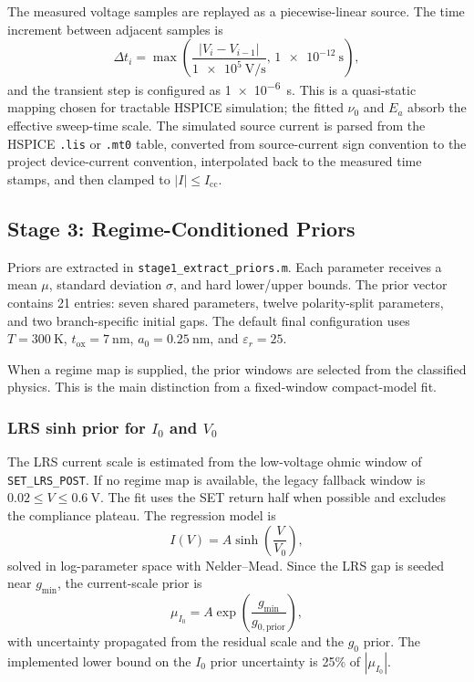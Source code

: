 \documentclass[journal]{IEEEtran}
\begin{document}
The measured voltage samples are replayed as a piecewise-linear source.  The
time increment between adjacent samples is
\[
  \Delta t_i =
  \max\left(\frac{|V_i-V_{i-1}|}{\SI{1e5}{\volt\per\second}},\,
  \SI{1e-12}{\second}\right),
\]
and the transient step is configured as \SI{1e-6}{\second}.  This is a
quasi-static mapping chosen for tractable HSPICE simulation; the fitted
$\nu_0$ and $E_a$ absorb the effective sweep-time scale.  The simulated source
current is parsed from the HSPICE \texttt{.lis} or \texttt{.mt0} table,
converted from source-current sign convention to the project device-current
convention, interpolated back to the measured time stamps, and then clamped to
$|I|\le I_{\mathrm{cc}}$.

\subsection{Stage 3: Regime-Conditioned Priors}
\label{sec:priors}

Priors are extracted in \texttt{stage1\_extract\_priors.m}.  Each parameter
receives a mean $\mu$, standard deviation $\sigma$, and hard lower/upper
bounds.  The prior vector contains 21 entries: seven shared parameters,
twelve polarity-split parameters, and two branch-specific initial gaps.  The
default final configuration uses $T=\SI{300}{\kelvin}$,
$t_{\mathrm{ox}}=\SI{7}{\nano\meter}$,
$a_0=\SI{0.25}{\nano\meter}$, and
$\varepsilon_r=25$.

When a regime map is supplied, the prior windows are selected from the
classified physics.  This is the main distinction from a fixed-window
compact-model fit.

\subsubsection{LRS sinh prior for $I_0$ and $V_0$}
The LRS current scale is estimated from the low-voltage ohmic window of
\texttt{SET\_LRS\_POST}.  If no regime map is available, the legacy fallback
window is $0.02\le V\le\SI{0.6}{\volt}$.  The fit uses the SET return half
when possible and excludes the compliance plateau.  The regression model is
\begin{equation}
  I(V) = A\sinh\left(\frac{V}{V_0}\right),
  \label{eq:sinh-prior}
\end{equation}
solved in log-parameter space with Nelder--Mead.  Since the LRS gap is seeded
near $g_{\min}$, the current-scale prior is
\begin{equation}
  \mu_{I_0} = A\exp\left(\frac{g_{\min}}{g_{0,\mathrm{prior}}}\right),
  \label{eq:i0-prior}
\end{equation}
with uncertainty propagated from the residual scale and the $g_0$ prior.  The
implemented lower bound on the $I_0$ prior uncertainty is 25\% of
$|\mu_{I_0}|$.
\end{document}
